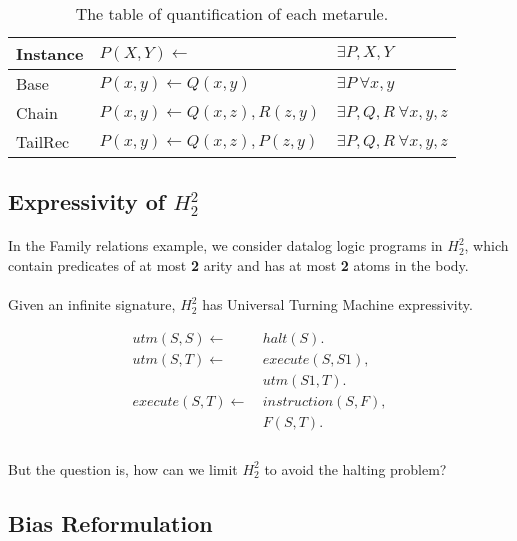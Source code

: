 \documentclass{article}
\theoremstyle{plain}
\theoremstyle{definition}
\begin{document}
\begin{multicols}{2}
\begin{table}[H]
\begin{tabular}{ | l | l | l | }
Instance & $P(X, Y) \leftarrow$ & $\exists P, X, Y$\\
\hline

Base & $P(x, y) \leftarrow Q(x, y)$ & $\exists P\ \forall x, y$\\
\hline

Chain & $P(x, y) \leftarrow Q(x, z), R(z, y)$ & $\exists P, Q, R\ \forall x, y, z$\\
\hline

TailRec & $P(x, y) \leftarrow Q(x, z), P(z, y)$ & $\exists P, Q, R\ \forall x, y, z$\\
\hline
\end{tabular}
\caption{The table of quantification of each metarule.}\label{table:MILMetarulesQuantification}
\end{table}

\subsection{Expressivity of $H^2_2$}

\paragraph{} In the Family relations example, we consider datalog logic programs in $H^2_2$, which contain predicates of at most \textbf{2} arity and has at most \textbf{2} atoms in the body.

\paragraph{} Given an infinite signature, $H^2_2$ has Universal Turning Machine expressivity.\cite{tarnlund77}

\begin{align*}
utm(S, S) \leftarrow\ &halt(S).\\
utm(S, T) \leftarrow\ &execute(S, S1),\\ &utm(S1, T).\\
execute(S, T) \leftarrow\ &instruction(S, F),\\ &F(S, T).\\
\end{align*}

\paragraph{} But the question is, how can we limit $H^2_2$ to avoid the halting problem?

\subsection{Bias Reformulation}


\end{multicols}
\end{document}
